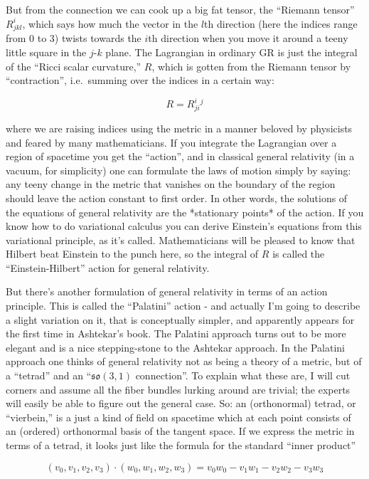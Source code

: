 \documentclass{article}
\begin{document}
But from the connection we can cook up a big fat tensor, the ``Riemann
tensor'' \(R^i_{jkl}\), which says how much the vector in the \(l\)th
direction (here the indices range from 0 to 3) twists towards the
\(i\)th direction when you move it around a teeny little square in the
\(j\)-\(k\) plane. The Lagrangian in ordinary GR is just the integral of
the ``Ricci scalar curvature,'' \(R\), which is gotten from the Riemann
tensor by ``contraction'', i.e.~summing over the indices in a certain
way:

\[R = R^i_{ji}{}^j\]

where we are raising indices using the metric in a manner beloved by
physicists and feared by many mathematicians. If you integrate the
Lagrangian over a region of spacetime you get the ``action'', and in
classical general relativity (in a vacuum, for simplicity) one can
formulate the laws of motion simply by saying: any teeny change in the
metric that vanishes on the boundary of the region should leave the
action constant to first order. In other words, the solutions of the
equations of general relativity are the *stationary points* of the
action. If you know how to do variational calculus you can derive
Einstein's equations from this variational principle, as it's called.
Mathematicians will be pleased to know that Hilbert beat Einstein to the
punch here, so the integral of \(R\) is called the ``Einstein-Hilbert''
action for general relativity.

But there's another formulation of general relativity in terms of an
action principle. This is called the ``Palatini'' action - and actually
I'm going to describe a slight variation on it, that is conceptually
simpler, and apparently appears for the first time in Ashtekar's book.
The Palatini approach turns out to be more elegant and is a nice
stepping-stone to the Ashtekar approach. In the Palatini approach one
thinks of general relativity not as being a theory of a metric, but of a
``tetrad'' and an ``\(\mathfrak{so}(3,1)\) connection''. To explain what
these are, I will cut corners and assume all the fiber bundles lurking
around are trivial; the experts will easily be able to figure out the
general case. So: an (orthonormal) tetrad, or ``vierbein,'' is a just a
kind of field on spacetime which at each point consists of an (ordered)
orthonormal basis of the tangent space. If we express the metric in
terms of a tetrad, it looks just like the formula for the standard
``inner product''

\[(v_0,v_1,v_2,v_3)\cdot(w_0,w_1,w_2,w_3) = v_0w_0 - v_1w_1 - v_2w_2 - v_3w_3\]
\end{document}
